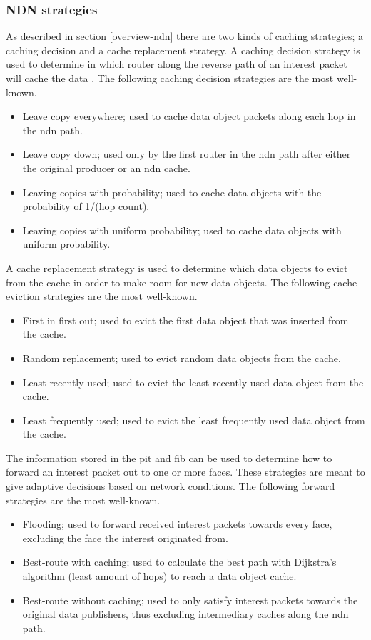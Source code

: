 \subsubsection{NDN strategies}
As described in section \ref{overview-ndn} there are two kinds of caching strategies; a caching decision and a cache replacement strategy. A caching decision strategy is used to determine in which router along the reverse path of an interest packet will cache the data \cite{koulouzis2018information}. The following caching decision strategies are the most well-known.

\begin{itemize}
    \item Leave copy everywhere; used to cache data object packets along each hop in the \gls{ndn} path.
    \item Leave copy down; used only by the first router in the \gls{ndn} path after either the original producer or an \gls{ndn} cache.
    \item Leaving copies with probability; used to cache data objects with the probability of 1/(hop count).
    \item Leaving copies with uniform probability; used to cache data objects with uniform probability.
\end{itemize}

A cache replacement strategy is used to determine which data objects to evict from the cache in order to make room for new data objects. The following cache eviction strategies are the most well-known.
\begin{itemize}
    \item First in first out; used to evict the first data object that was inserted from the cache.
    \item Random replacement; used to evict random data objects from the cache.
    \item Least recently used; used to evict the least recently used data object from the cache.
    \item Least frequently used; used to evict the least frequently used data object from the cache.
\end{itemize}

The information stored in the \gls{pit} and \gls{fib} can be used to determine how to forward an interest packet out to one or more faces. These strategies are meant to give adaptive decisions based on network conditions. The following forward strategies are the most well-known.
\begin{itemize}
    \item Flooding; used to forward received interest packets towards every face, excluding the face the interest originated from.
    \item Best-route with caching; used to calculate the best path with Dijkstra's algorithm (least amount of hops) to reach a data object cache.
    \item Best-route without caching; used to only satisfy interest packets towards the original data publishers, thus excluding intermediary caches along the \gls{ndn} path.
\end{itemize}

